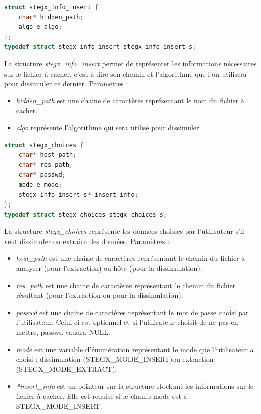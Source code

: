 \documentclass[11pt]{article}
\begin{document}
\begin{lstlisting}[language=c]
struct stegx_info_insert {
    char* hidden_path;
    algo_e algo;
};
typedef struct stegx_info_insert stegx_info_insert_s;
\end{lstlisting}

La structure \textit{stegx\_info\_insert} permet de représenter les informations 
nécessaires sur le fichier à cacher, c'est-à-dire son chemin et l'algorithme que 
l'on utilisera pour dissimuler ce dernier. \newline
\underline{Paramètres :}
\begin{itemize}
\item \textit{hidden\_path} est une chaine de caractères représentant le nom du fichier 
à cacher. 
\item \textit{algo} représente l'algorithme qui sera utilisé pour dissimuler. 
\newline
\end{itemize}

\begin{lstlisting}[language=c]
struct stegx_choices {
    char* host_path;
    char* res_path;                         
    char* passwd;                           
    mode_e mode;                        
    stegx_info_insert_s* insert_info;             
};
typedef struct stegx_choices stegx_choices_s;
\end{lstlisting}

La structure \textit{stegx\_choices} représente les données choisies par l'utilisateur 
s'il veut dissimuler ou extraire des données. \newline
\underline{Paramètres :}
\begin{itemize}
\item \textit{host\_path} est une chaine de caractères représentant le chemin
du fichier à analyser (pour l'extraction) ou hôte (pour la dissimulation). 
\item \textit{res\_path} est une chaine de caractères représentant le chemin
du fichier résultant (pour l'extraction ou pour la dissimulation). 
\item \textit{passwd} est une chaine de caractères représentant le mot de passe 
choisi par l'utilisateur. Celui-ci est optionnel et si l'utilisateur choisit 
de ne pas en mettre, passwd vaudra NULL. 
\item \textit{mode} est une variable d'énumération représentant le mode que 
l'utilisateur a choisi : dissimulation (STEGX\_MODE\_INSERT)ou extraction 
(STEGX\_MODE\_EXTRACT).  
\item \textit{*insert\_info} est un pointeur sur la structure stockant les informations 
sur le fichier à cacher. Elle est requise si le champ mode est à STEGX\_MODE\_INSERT. 
\newline
\end{itemize}
\end{document}
